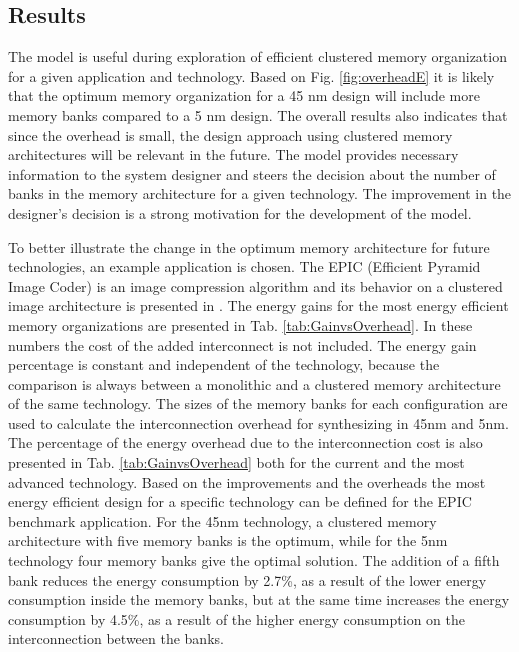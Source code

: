  
\subsection{Results}
 
The model is useful during exploration of efficient clustered memory organization for a given application and technology. 
Based on Fig. \ref{fig:overheadE} it is likely that the optimum memory organization for a 45 nm design will include more memory banks compared to a 5 nm design.
The overall results also indicates that since the overhead is small, the design approach using clustered memory architectures will be relevant in the future.
The model provides necessary information to the system designer and steers the decision about the number of banks in the memory architecture for a given technology.
The improvement in the designer's decision is a strong motivation for the development of the model. 

To better illustrate the change in the optimum memory architecture for future technologies, an example application is chosen.
The EPIC (Efficient Pyramid Image Coder)  is an image compression algorithm and its behavior on a clustered image architecture is presented in \cite{filippopoulos2013exploration}.
The energy gains for the most energy efficient memory organizations are presented in Tab. \ref{tab:GainvsOverhead}. In these numbers the cost of the added interconnect is not included.
The energy gain percentage is constant and independent of the technology, because the comparison is always between a monolithic and a clustered memory architecture of the same technology.
The sizes of the memory banks for each configuration are used to calculate the interconnection overhead for synthesizing in 45nm and 5nm.
The percentage of the energy overhead due to the interconnection cost is also presented in Tab. \ref{tab:GainvsOverhead} both for the current and the most advanced technology.
Based on the improvements and the overheads the most energy efficient design for a specific technology can be defined for the EPIC benchmark application.
For the 45nm technology, a clustered memory architecture with five memory banks is the optimum, while for the 5nm technology four memory banks give the optimal solution.
The addition of a fifth bank reduces the energy consumption by 2.7\%, as a result of the lower energy consumption inside the memory banks, but at the same time increases the energy consumption by 4.5\%, as a result of the higher energy consumption on the interconnection between the banks.

